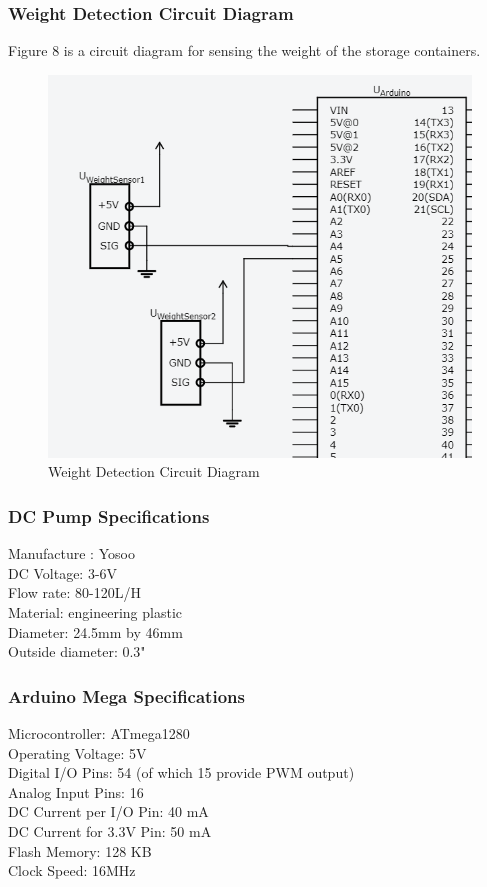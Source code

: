 \documentclass [10pt]{article}
\begin{document}
\subsubsection{Weight Detection Circuit Diagram}
Figure 8 is a circuit diagram for sensing the weight of the storage containers.
\begin{figure} [h!]
	\centering
	\includegraphics [scale = 0.5] {Figures/WeightSensors.png}
	\caption{Weight Detection Circuit Diagram}
\end{figure}


\subsubsection{DC Pump Specifications}
Manufacture : Yosoo \\
DC Voltage: 3-6V\\
Flow rate: 80-120L/H\\
Material: engineering plastic\\
Diameter: 24.5mm by 46mm \\
Outside diameter:  0.3" 


\subsubsection{Arduino Mega Specifications} 
Microcontroller:	ATmega1280\\
Operating Voltage:	5V\\
Digital I/O Pins: 54 (of which 15 provide PWM output)\\
Analog Input Pins: 16\\
DC Current per I/O Pin: 40 mA\\
DC Current for 3.3V Pin: 50 mA\\
Flash Memory: 128 KB\\
Clock Speed: 16MHz\\
\end{document}
